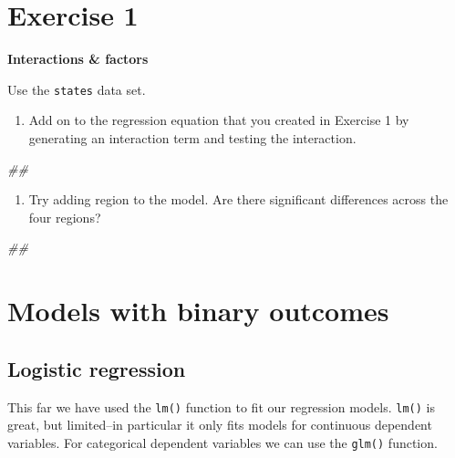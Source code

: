 \documentclass[]{book}
\newenvironment{Shaded}{\begin{snugshade}}{\end{snugshade}}
\newcommand{\CommentTok}[1]{\textcolor[rgb]{0.56,0.35,0.01}{\textit{#1}}}
\providecommand{\tightlist}{%
  \setlength{\itemsep}{0pt}\setlength{\parskip}{0pt}}
\begin{document}
\hypertarget{exercise-1-1}{%
\section{Exercise 1}\label{exercise-1-1}}

\textbf{Interactions \& factors}

Use the \texttt{states} data set.

\begin{enumerate}
\def\labelenumi{\arabic{enumi}.}
\tightlist
\item
  Add on to the regression equation that you created in Exercise 1 by generating an interaction term and testing the interaction.
\end{enumerate}

\begin{Shaded}
\begin{Highlighting}[]
\CommentTok{## }
\end{Highlighting}
\end{Shaded}

\begin{enumerate}
\def\labelenumi{\arabic{enumi}.}
\setcounter{enumi}{1}
\tightlist
\item
  Try adding region to the model. Are there significant differences across the four regions?
\end{enumerate}

\begin{Shaded}
\begin{Highlighting}[]
\CommentTok{## }
\end{Highlighting}
\end{Shaded}

\hypertarget{models-with-binary-outcomes}{%
\section{Models with binary outcomes}\label{models-with-binary-outcomes}}

\hypertarget{logistic-regression}{%
\subsection{Logistic regression}\label{logistic-regression}}

This far we have used the \texttt{lm()} function to fit our regression models. \texttt{lm()} is great, but limited--in particular it only fits models for continuous dependent variables. For categorical dependent variables we can use the \texttt{glm()} function.
\end{document}
